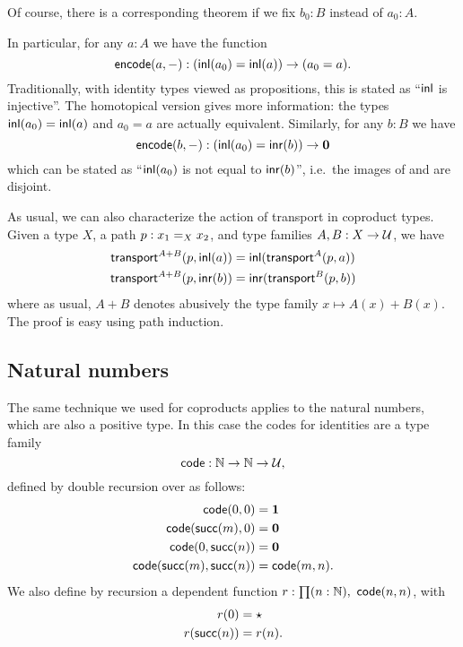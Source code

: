 Of course, there is a corresponding theorem if we fix $b_0:B$ instead of $a_0:A$.

In particular, for any $a:A$ we have the function
\[ \encode(a,-) : (\inl(a_0)=\inl(a)) \to (a_0=a).\]
Traditionally, with identity types viewed as propositions, this is stated as ``$\inl$ is injective''.
The homotopical version gives more information: the types $\inl(a_0)=\inl(a)$ and $a_0=a$ are actually equivalent.
Similarly, for any $b:B$ we have
\[ \encode(b,-) : (\inl(a_0)=\inr(b)) \to \emptyt \]
which can be stated as ``$\inl(a_0)$ is not equal to $\inr(b)$'', i.e.\ the images of \inl and \inr are disjoint.

As usual, we can also characterize the action of transport in coproduct types.
Given a type $X$, a path $p:\id[X]{x_1}{x_2}$, and type families $A,B:X\to\type$, we have
\begin{align*}
  \transfib{A+B}{p}{\inl(a)} &= \inl (\transfib{A}{p}{a})\\
  \transfib{A+B}{p}{\inr(b)} &= \inr (\transfib{B}{p}{b})
\end{align*}
where as usual, $A+B$ denotes abusively the type family $x\mapsto A(x)+B(x)$.
The proof is easy using path induction.


\subsection{Natural numbers}
\label{sec:compute-nat}

The same technique we used for coproducts applies to the natural numbers, which are also a positive type.
In this case the codes for identities are a type family
\[\code:\N\to\N\to\type,\]
defined by double recursion over \N as follows:
\begin{align*}
  \code(0,0) &= \unit\\
  \code(\suc(m),0) &= \emptyt\\
  \code(0,\suc(n)) &= \emptyt\\
  \code(\suc(m),\suc(n)) &= \code(m,n).
\end{align*}
We also define by recursion a dependent function $r:\prd{n:\N} \code(n,n)$, with
\begin{align*}
  r(0) &= \ttt\\
  r(\suc(n)) &= r(n).
\end{align*}

